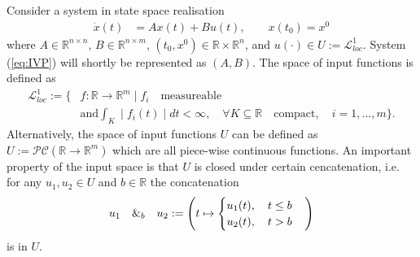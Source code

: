 \bigskip
Consider a system in state space realisation
\begin{align}
	\dot{x}(t) &= Ax(t) + Bu(t),\qquad x(t_0) = x^0 \label{eq:IVP}
\end{align}
where $A\in\mathbb{R}^{n\times n}$, $B\in\mathbb{R}^{n\times m}$, $(t_0,x^0)\in\mathbb{R}\times\mathbb{R}^n$, and $u(\cdot) \in U := \mathcal{L}_{loc}^1$. System (\ref{eq:IVP}) will shortly be represented as $(A,B)$. The space of input functions is defined as
\begin{align*}
	\mathcal{L}_{loc}^1 := \{&f:\mathbb{R}\rightarrow\mathbb{R}^m \mid f_i \quad\text{measureable}\\
	&\text{and} \int_K \mid f_i(t)\mid dt < \infty , \quad \forall K \subseteq \mathbb{R} \quad \text{compact}, \quad i=1,...,m  \}.
\end{align*}
Alternatively, the space of input functions $U$ can be defined as $U := \mathcal{PC}(\mathbb{R}\rightarrow\mathbb{R}^m)$ which are all piece-wise continuous functions. An important property of the input space is that $U$ is closed under certain cencatenation, i.e. for any $u_1,u_2\in U$ and $b \in \mathbb{R}$ the concatenation
\begin{align*}
	u_1 \quad\&_b\quad u_2 := \left(t \mapsto
	\begin{cases}
		u_1(t), \quad t \le b\cr
		u_2(t), \quad t > b
	\end{cases} \right)
\end{align*}
is in $U$.

